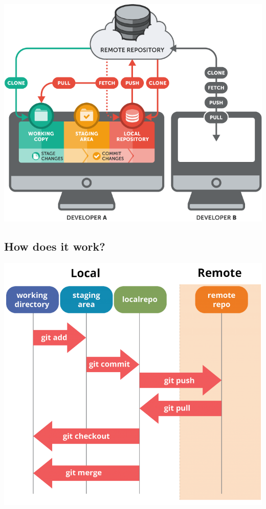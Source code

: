 \documentclass[11pt]{article}
\begin{document}
\begin{center}
\includegraphics[width=.9\linewidth]{./remote.png}
\end{center}

\newpage
\subsection{How does it work?}
\label{sec:org3adb940}



\begin{center}
\includegraphics[width=.9\linewidth]{./git.png}
\end{center}
\end{document}
